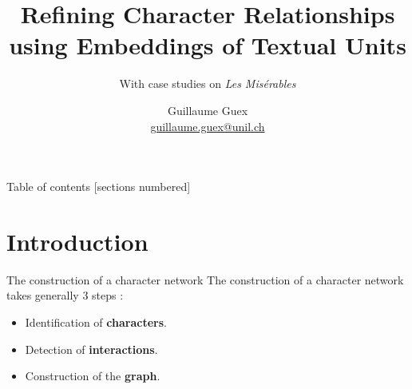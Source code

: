 \documentclass[10pt]{beamer}
\title{Refining Character Relationships using Embeddings of Textual Units}
\subtitle{With case studies on \emph{Les Misérables}}
\date{}
\author{Guillaume Guex \\ \href{mailto:guillaume.guex@unil.ch}{\color{blue} guillaume.guex@unil.ch}}
\institute{Departement of Language and Information Sciences \\ University of Lausanne}
\newcommand{\imp}[1]{\textbf{\color{cyan}#1}}
\begin{document}
	
	
	\maketitle
	
	
	\begin{frame}{Table of contents}
		[sections numbered]
		\tableofcontents%
	\end{frame}

	
	\section[Introduction]{Introduction}
	
	
	\begin{frame}{The construction of a character network}
		The construction of a character network takes generally 3 steps \cite{labatut_extraction_2019}:
		\begin{itemize}
			\item Identification of \imp{characters}.
			\item Detection of \imp{interactions}.
			\item Construction of the \imp{graph}.
		\end{itemize}
	\end{frame}

	
\end{document}
